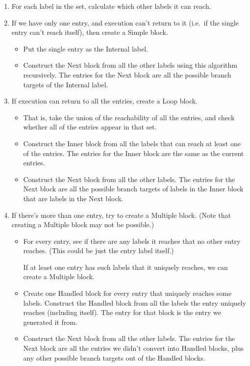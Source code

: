 \documentclass[10pt, a4paper]{article}
\begin{document}
\begin{enumerate}[label=\boxed{\arabic*}]
\item %
For each label in the set, calculate which other labels it can reach.

\item
If we have only one entry, and execution can't return to it (i.e.\ if the single entry can't reach itself), then create a Simple block.
\begin{itemize}
\item
Put the single entry as the Internal label.
\item
Construct the Next block from all the other labels using this algorithm recursively.
The entries for the Next block are all the possible branch targets of the Internal label.
\end{itemize}

\item\label{relooper step: create loop block}
If execution can return to all the entries, create a Loop block.
\begin{itemize}
\item That is, take the union of the reachability of all the entries, and check whether all of the entries appear in that set.
\item Construct the Inner block from all the labels that can reach at least one of the entries.
The entries for the Inner block are the same as the current entries.
\item Construct the Next block from all the other labels.
The entries for the Next block are all the possible branch targets of labels in the Inner block that are labels in the Next block.
\end{itemize}

\item
If there's more than one entry, try to create a Multiple block. (Note that creating a Multiple block may not be possible.)

\begin{itemize}
\item For every entry, see if there are any labels it reaches that no other entry reaches. (This could be just the entry label itself.)

If at least one entry has such labels that it uniquely reaches, we can create a Multiple block.
\item Create one Handled block for every entry that uniquely reaches some labels.
Construct the Handled block from all the labels the entry uniquely reaches (including itself). The entry for that block is the entry we generated it from.
\item Construct the Next block from all the other labels. The entries for the Next block are all the entries we didn't convert into Handled blocks, plus any other possible branch targets out of the Handled blocks.
\end{itemize}


\end{enumerate}
\end{document}
